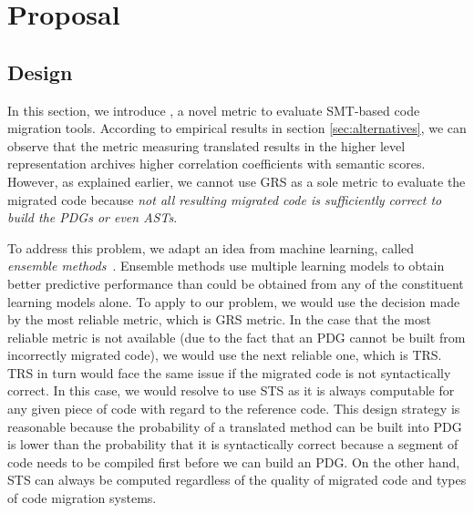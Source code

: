 \section{Proposal}
\label{sec:proposal}


\subsection{Design}

%

In this section, we introduce {\model}, a novel metric to evaluate 
SMT-based code migration tools.
According to empirical results in section \ref{sec:alternatives}, we can
observe that the metric measuring translated results in the higher level 
representation archives higher correlation coefficients with semantic scores.
However, as explained earlier, we cannot use GRS as a sole metric to
evaluate the migrated code because {\em not all resulting migrated
code is sufficiently correct to build the PDGs or even ASTs}. 

To address this problem, we adapt an idea from machine learning,
called {\em ensemble methods}~\cite{ensemble}. Ensemble methods 
use multiple learning models to obtain better
predictive performance than could be obtained from any of the
constituent learning models alone.
To apply to our problem, we would use the decision made by the most
reliable metric, which is GRS metric. In the case that the most
reliable metric is not available (due to the fact that an PDG cannot
be built from incorrectly migrated code), we would use the next
reliable one, which is TRS. TRS in turn would face the same issue
if the migrated code is not syntactically correct. In this case, we
would resolve to use STS as it is always computable for any given
piece of code with regard to the reference code. This design strategy
is reasonable because the probability of a translated method can be
built into PDG is lower than the probability that it is syntactically
correct because a segment of code needs to be compiled first before we
can build an PDG. On the other hand, STS can always be computed
regardless of the quality of migrated code and types of code migration
systems.

